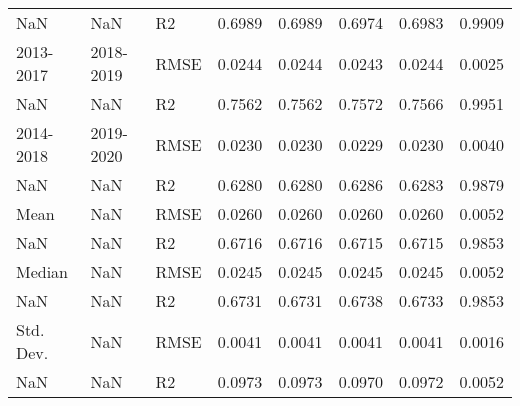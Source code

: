 \begin{tabular}{lllrrrrr}
       NaN &        NaN &      R2 &  0.6989 &  0.6989 &  0.6974 &       0.6983 &  0.9909 \\
 2013-2017 &  2018-2019 &    RMSE &  0.0244 &  0.0244 &  0.0243 &       0.0244 &  0.0025 \\
       NaN &        NaN &      R2 &  0.7562 &  0.7562 &  0.7572 &       0.7566 &  0.9951 \\
 2014-2018 &  2019-2020 &    RMSE &  0.0230 &  0.0230 &  0.0229 &       0.0230 &  0.0040 \\
       NaN &        NaN &      R2 &  0.6280 &  0.6280 &  0.6286 &       0.6283 &  0.9879 \\
      Mean &        NaN &    RMSE &  0.0260 &  0.0260 &  0.0260 &       0.0260 &  0.0052 \\
       NaN &        NaN &      R2 &  0.6716 &  0.6716 &  0.6715 &       0.6715 &  0.9853 \\
    Median &        NaN &    RMSE &  0.0245 &  0.0245 &  0.0245 &       0.0245 &  0.0052 \\
       NaN &        NaN &      R2 &  0.6731 &  0.6731 &  0.6738 &       0.6733 &  0.9853 \\
 Std. Dev. &        NaN &    RMSE &  0.0041 &  0.0041 &  0.0041 &       0.0041 &  0.0016 \\
       NaN &        NaN &      R2 &  0.0973 &  0.0973 &  0.0970 &       0.0972 &  0.0052 \\
\bottomrule
\end{tabular}
